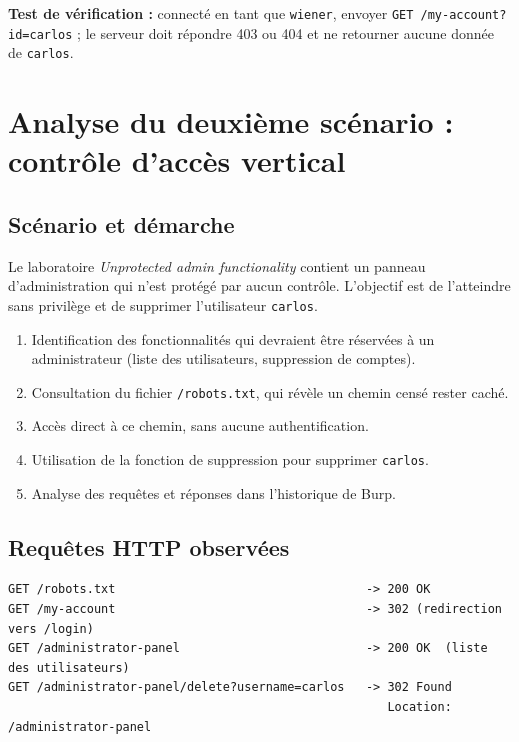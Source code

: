 \documentclass{rapportENSIAS}
\begin{document}
\textbf{Test de vérification :} connecté en tant que \texttt{wiener}, envoyer \texttt{GET /my-account?id=carlos} ; le serveur doit répondre 403 ou 404 et ne retourner aucune donnée de \texttt{carlos}.

\section{Analyse du deuxième scénario : contrôle d'accès vertical}

\subsection{Scénario et démarche}

Le laboratoire \textit{Unprotected admin functionality} contient un panneau d'administration qui n'est protégé par aucun contrôle. L'objectif est de l'atteindre sans privilège et de supprimer l'utilisateur \texttt{carlos}.

\begin{enumerate}
  \item Identification des fonctionnalités qui devraient être réservées à un administrateur (liste des utilisateurs, suppression de comptes).
  \item Consultation du fichier \texttt{/robots.txt}, qui révèle un chemin censé rester caché.
  \item Accès direct à ce chemin, sans aucune authentification.
  \item Utilisation de la fonction de suppression pour supprimer \texttt{carlos}.
  \item Analyse des requêtes et réponses dans l'historique de Burp.
\end{enumerate}



\subsection{Requêtes HTTP observées}

\begin{verbatim}
GET /robots.txt                                   -> 200 OK
GET /my-account                                   -> 302 (redirection vers /login)
GET /administrator-panel                          -> 200 OK  (liste des utilisateurs)
GET /administrator-panel/delete?username=carlos   -> 302 Found
                                                     Location: /administrator-panel
\end{verbatim}
\end{document}
